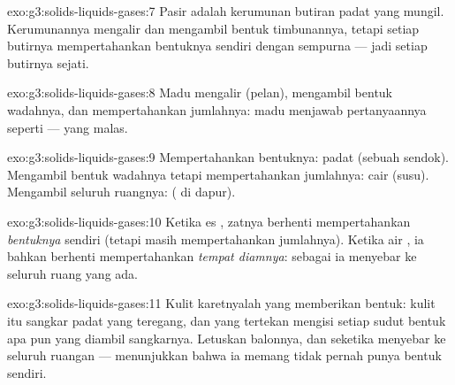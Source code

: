 \begin{solution}{exo:g3:solids-liquids-gases:7}
Pasir adalah kerumunan butiran padat yang mungil. Kerumunannya
mengalir dan mengambil bentuk timbunannya, tetapi setiap butirnya
mempertahankan bentuknya sendiri dengan sempurna --- jadi setiap
butirnya  sejati.
\end{solution}

\begin{solution}{exo:g3:solids-liquids-gases:8}
Madu mengalir (pelan), mengambil bentuk wadahnya, dan mempertahankan
jumlahnya: madu menjawab pertanyaannya seperti  --- 
yang malas.
\end{solution}

\begin{solution}{exo:g3:solids-liquids-gases:9}
Mempertahankan bentuknya: padat (sebuah sendok). Mengambil bentuk
wadahnya tetapi mempertahankan jumlahnya: cair (susu). Mengambil
seluruh ruangnya:  ( di dapur).
\end{solution}

\begin{solution}{exo:g3:solids-liquids-gases:10}
Ketika es , zatnya berhenti mempertahankan \emph{bentuknya}
sendiri (tetapi masih mempertahankan jumlahnya). Ketika air ,
ia bahkan berhenti mempertahankan \emph{tempat diamnya}: sebagai 
ia menyebar ke seluruh ruang yang ada.
\end{solution}

\begin{solution}{exo:g3:solids-liquids-gases:11}
Kulit karetnyalah yang memberikan bentuk: kulit itu sangkar padat yang
teregang, dan  yang tertekan mengisi setiap sudut bentuk apa pun
yang diambil sangkarnya. Letuskan balonnya, dan  seketika
menyebar ke seluruh ruangan --- menunjukkan bahwa ia memang tidak
pernah punya bentuk sendiri.
\end{solution}
